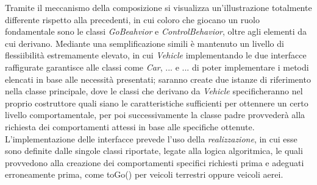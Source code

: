 \documentclass{article}
\begin{document}
Tramite il meccanismo della composizione si visualizza un'illustrazione totalmente differente rispetto alla precedenti, in cui coloro che giocano un ruolo fondamentale sono le classi \textit{GoBeahvior} e \textit{ControlBehavior}, oltre agli elementi da cui derivano. Mediante una semplificazione simili è mantenuto un livello di flessiibilità estremamente elevato, in cui \textit{Vehicle} implementando le due interfacce raffigurate garantisce alle classi come \textit{Car}, ... e ... di poter implementare i metodi elencati in base alle necessità presentati; saranno create due istanze di riferimento nella classe principale, dove le classi che derivano da \textit{Vehicle} specificheranno nel proprio costruttore quali siano le caratteristiche sufficienti per ottennere un certo livello comportamentale, per poi successivamente la classe padre provvederà alla richiesta dei comportamenti attessi in base alle specifiche ottenute. L'implementazione delle interfacce prevede l'uso della \textit{realizzazione}, in cui esse sono definite dalle singole classi riportate, legate alla logica algoritmica, le quali provvedono alla creazione dei comportamenti specifici richiesti prima e adeguati erroneamente prima, come toGo() per veicoli terrestri oppure veicoli aerei.
\end{document}
